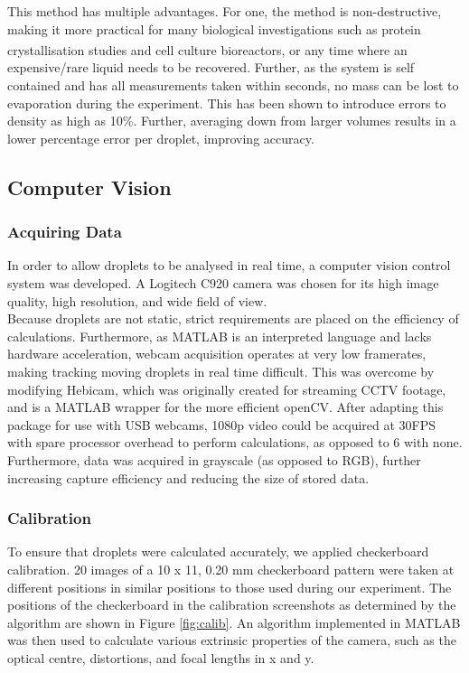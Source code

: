 \documentclass{physics_article_B}
\begin{document}
        This method has multiple advantages. For one, the method is non-destructive, making it more practical for many biological investigations such as protein crystallisation  studies\textsuperscript{\cite{zhu}} and cell culture bioreactors\textsuperscript{\cite{konry}}, or any time where an expensive/rare liquid needs to be recovered\cite{backholm}. Further, as the system is self contained and has all measurements taken within seconds, no mass can be lost to evaporation during the experiment. This has been shown to introduce errors to density as high as 10\%. Further, averaging down from larger volumes results in a lower percentage error per droplet, improving accuracy.
        
    \subsection{Computer Vision\label{sect_vision}}
        
        \subsubsection{Acquiring Data}
            In order to allow droplets to be analysed in real time, a computer vision control system was developed. A Logitech C920 camera was chosen for its high image quality, high resolution, and wide field of view. \\
            
            Because droplets are not static, strict requirements are placed on the efficiency of calculations. Furthermore, as MATLAB is an interpreted language and lacks hardware acceleration, webcam acquisition operates at very low framerates, making tracking moving droplets in real time difficult. This was overcome by modifying Hebicam\cite{HebiCam}, which was originally created for streaming CCTV footage, and is a MATLAB wrapper for the more efficient openCV. After adapting this package for use with USB webcams, 1080p video could be acquired at 30FPS with spare processor overhead to perform calculations, as opposed to 6 with none. Furthermore, data was acquired in grayscale (as opposed to RGB), further increasing capture efficiency and reducing the size of stored data. 
            
    
        \subsubsection{Calibration}

            To ensure that droplets were calculated accurately, we applied checkerboard calibration. 20 images of a 10 x 11, 0.20 mm checkerboard pattern were taken at different positions in similar positions to those used during our experiment. The positions of the checkerboard in the calibration screenshots as determined by the algorithm are shown in Figure \ref{fig:calib}. An algorithm implemented in MATLAB\cite{CameraCalibration} was then used to calculate various extrinsic properties of the camera, such as the optical centre, distortions, and focal lengths in x and y. 
            
\end{document}
